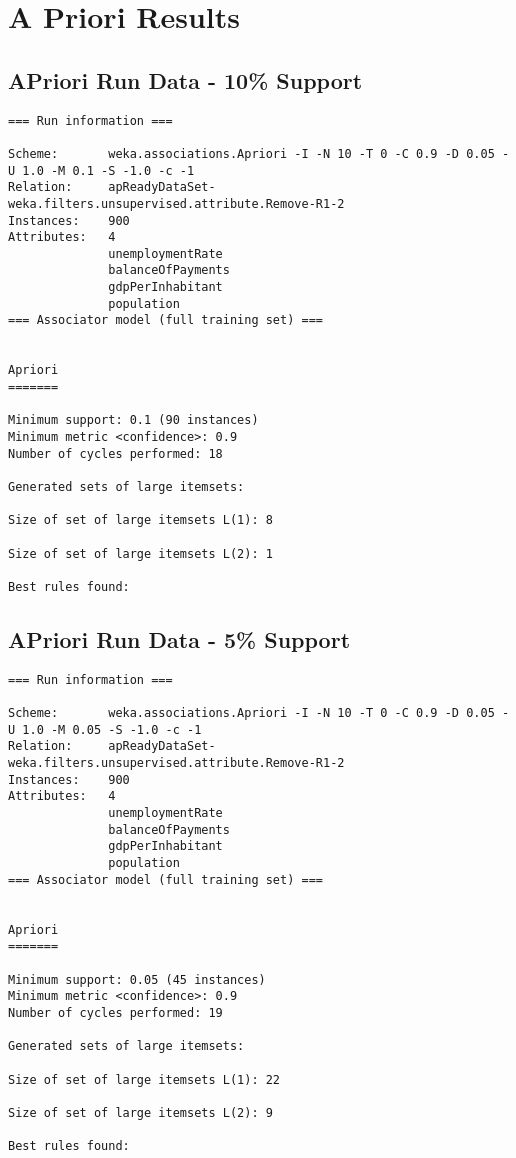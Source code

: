 \section{A Priori Results}
\label{A_ap_results}

\subsection{APriori Run Data - 10\% Support}
\begin{lstlisting}[basicstyle=\footnotesize\ttfamily,numbers=none]
=== Run information ===

Scheme:       weka.associations.Apriori -I -N 10 -T 0 -C 0.9 -D 0.05 -U 1.0 -M 0.1 -S -1.0 -c -1
Relation:     apReadyDataSet-weka.filters.unsupervised.attribute.Remove-R1-2
Instances:    900
Attributes:   4
              unemploymentRate
              balanceOfPayments
              gdpPerInhabitant
              population
=== Associator model (full training set) ===


Apriori
=======

Minimum support: 0.1 (90 instances)
Minimum metric <confidence>: 0.9
Number of cycles performed: 18

Generated sets of large itemsets:

Size of set of large itemsets L(1): 8

Size of set of large itemsets L(2): 1

Best rules found:
\end{lstlisting}

\subsection{APriori Run Data - 5\% Support}
\begin{lstlisting}[basicstyle=\footnotesize\ttfamily,numbers=none]
=== Run information ===

Scheme:       weka.associations.Apriori -I -N 10 -T 0 -C 0.9 -D 0.05 -U 1.0 -M 0.05 -S -1.0 -c -1
Relation:     apReadyDataSet-weka.filters.unsupervised.attribute.Remove-R1-2
Instances:    900
Attributes:   4
              unemploymentRate
              balanceOfPayments
              gdpPerInhabitant
              population
=== Associator model (full training set) ===


Apriori
=======

Minimum support: 0.05 (45 instances)
Minimum metric <confidence>: 0.9
Number of cycles performed: 19

Generated sets of large itemsets:

Size of set of large itemsets L(1): 22

Size of set of large itemsets L(2): 9

Best rules found:
\end{lstlisting}

